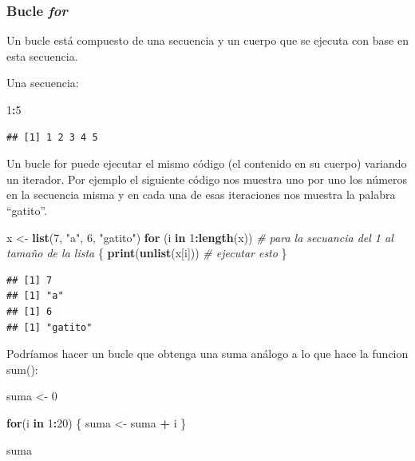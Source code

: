 \documentclass[]{book}
\newenvironment{Shaded}{\begin{snugshade}}{\end{snugshade}}
\newcommand{\KeywordTok}[1]{\textcolor[rgb]{0.13,0.29,0.53}{\textbf{#1}}}
\newcommand{\DecValTok}[1]{\textcolor[rgb]{0.00,0.00,0.81}{#1}}
\newcommand{\StringTok}[1]{\textcolor[rgb]{0.31,0.60,0.02}{#1}}
\newcommand{\CommentTok}[1]{\textcolor[rgb]{0.56,0.35,0.01}{\textit{#1}}}
\newcommand{\ControlFlowTok}[1]{\textcolor[rgb]{0.13,0.29,0.53}{\textbf{#1}}}
\newcommand{\OperatorTok}[1]{\textcolor[rgb]{0.81,0.36,0.00}{\textbf{#1}}}
\newcommand{\NormalTok}[1]{#1}
\theoremstyle{definition}
\theoremstyle{definition}
\theoremstyle{definition}
\theoremstyle{remark}
\begin{document}
\subsubsection{\texorpdfstring{Bucle
\emph{for}}{Bucle for}}\label{bucle-for}

Un bucle está compuesto de una secuencia y un cuerpo que se ejecuta con
base en esta secuencia.

Una secuencia:

\begin{Shaded}
\begin{Highlighting}[]
\DecValTok{1}\OperatorTok{:}\DecValTok{5}
\end{Highlighting}
\end{Shaded}

\begin{verbatim}
## [1] 1 2 3 4 5
\end{verbatim}

Un bucle for puede ejecutar el mismo código (el contenido en su cuerpo)
variando un iterador. Por ejemplo el siguiente código nos muestra uno
por uno los números en la secuencia misma y en cada una de esas
iteraciones nos muestra la palabra ``gatito''.

\begin{Shaded}
\begin{Highlighting}[]
\NormalTok{x <-}\StringTok{ }\KeywordTok{list}\NormalTok{(}\DecValTok{7}\NormalTok{, }\StringTok{"a"}\NormalTok{, }\DecValTok{6}\NormalTok{, }\StringTok{"gatito"}\NormalTok{)}
\ControlFlowTok{for}\NormalTok{ (i }\ControlFlowTok{in} \DecValTok{1}\OperatorTok{:}\KeywordTok{length}\NormalTok{(x)) }\CommentTok{# para la secuancia del 1 al tamaño de la lista}
\NormalTok{\{}
  \KeywordTok{print}\NormalTok{(}\KeywordTok{unlist}\NormalTok{(x[i])) }\CommentTok{# ejecutar esto }
\NormalTok{\}}
\end{Highlighting}
\end{Shaded}

\begin{verbatim}
## [1] 7
## [1] "a"
## [1] 6
## [1] "gatito"
\end{verbatim}

Podríamos hacer un bucle que obtenga una suma análogo a lo que hace la
funcion sum():

\begin{Shaded}
\begin{Highlighting}[]
\NormalTok{suma <-}\StringTok{ }\DecValTok{0}

\ControlFlowTok{for}\NormalTok{(i }\ControlFlowTok{in} \DecValTok{1}\OperatorTok{:}\DecValTok{20}\NormalTok{) \{}
\NormalTok{  suma <-}\StringTok{ }\NormalTok{suma }\OperatorTok{+}\StringTok{ }\NormalTok{i}
\NormalTok{\}}

\NormalTok{suma}
\end{Highlighting}
\end{Shaded}
\end{document}
